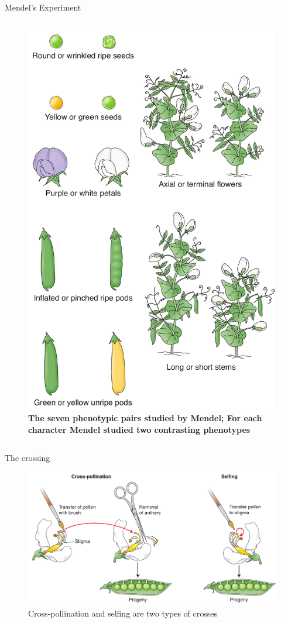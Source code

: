 \documentclass[11pt,ignorenonframetext,aspectratio=169]{beamer}
\begin{document}
\begin{frame}{Mendel's Experiment}
\begin{columns}[T,onlytextwidth]
\begin{figure}
\includegraphics[width=0.5\linewidth]{../images/mendels_pea} \caption{\textbf{The seven phenotypic pairs studied by Mendel; For each character Mendel studied two contrasting phenotypes} \newline }\label{fig:mendels-pea}
\end{figure}

\end{columns}
\end{frame}

\begin{frame}{The crossing}
\protect\hypertarget{the-crossing}{}
\begin{figure}
\includegraphics[width=0.8\linewidth]{../images/crossing_selfing} \caption{Cross-pollination and selfing are two types of crosses}\label{fig:crossing-pea}
\end{figure}
\end{frame}
\end{document}
